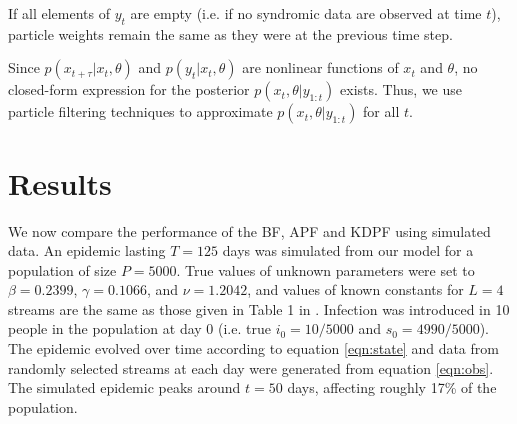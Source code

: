 \documentclass[useAMS,referee,usenatbib]{biom}
\begin{document}
If all elements of $y_t$ are empty (i.e. if no syndromic data are observed at time $t$), particle weights remain the same as they were at the previous time step.

Since $p(x_{t+\tau}|x_t,\theta)$ and $p(y_t|x_t,\theta)$ are nonlinear functions of $x_t$ and $\theta$, no closed-form expression for the posterior $p(x_t,\theta|y_{1:t})$ exists.  Thus, we use particle filtering techniques to approximate $p(x_t,\theta|y_{1:t})$ for all $t$.

\section{Results \label{sec:results}}

We now compare the performance of the BF, APF and KDPF using simulated data.  An epidemic lasting $T = 125$ days was simulated from our model for a population of size $P = 5000$.  True values of unknown parameters were set to $\beta = 0.2399$, $\gamma = 0.1066$, and $\nu = 1.2042$, and values of known constants for $L = 4$ streams are the same as those given in Table 1 in \citet{skvortsov2012monitoring}.  Infection was introduced in 10 people in the population at day 0 (i.e. true $i_0 = 10/5000$ and $s_0 = 4990/5000$).  The epidemic evolved over time according to equation \eqref{eqn:state} and data from randomly selected streams at each day were generated from equation \eqref{eqn:obs}.  The simulated epidemic peaks around $t = 50$ days, affecting roughly 17\% of the population.

%
\end{document}
